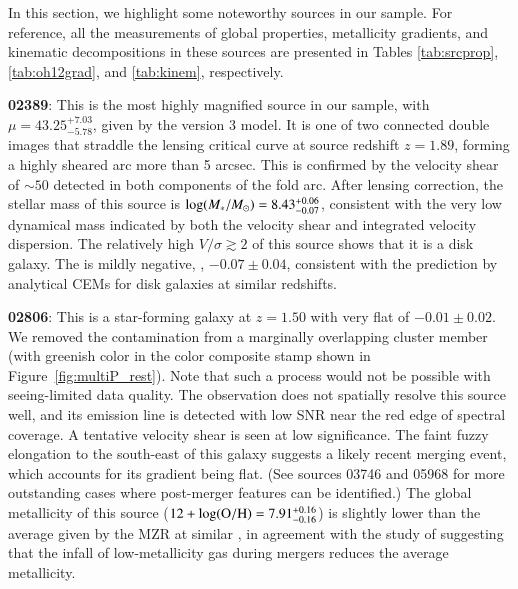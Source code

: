 In this section, we highlight some noteworthy sources in our \mg sample. For
reference, all the measurements of global properties, metallicity gradients, and kinematic
decompositions in these sources are presented in Tables \ref{tab:srcprop},
\ref{tab:oh12grad}, and \ref{tab:kinem}, respectively.

{\bf 02389}: This is the most highly magnified source in our sample, with $\mu=43.25_{-5.78}^{+7.03}$, given by the \SJ version 3
model.  It is one of two connected double images that straddle the lensing critical curve at source redshift $z=1.89$, forming a
highly sheared arc more than 5 arcsec.  This is confirmed by the velocity shear of $\sim50$ \kms detected in both components of
the fold arc.  After lensing correction, the stellar mass of this source is $\log(M_\ast/M_\odot)=8.43_{-0.07}^{+0.06}$, consistent
with the very low dynamical mass indicated by both the velocity shear and integrated velocity dispersion.  The relatively high
$V/\sigma \gtrsim 2$ of this source shows that it is a disk galaxy. The \mg is mildly negative, \ie, $-0.07\pm0.04$, consistent
with the prediction by analytical CEMs for disk galaxies at similar redshifts.

{\bf 02806}: This is a star-forming galaxy at $z=1.50$ with very flat \mg of $-0.01\pm0.02$.  We removed the contamination from a
marginally overlapping cluster member (with greenish color in the color composite stamp shown in Figure~\ref{fig:multiP_rest}).
Note that such a process would not be possible with seeing-limited data quality.  The \muse observation does not spatially resolve
this source well, and its \OII emission line is detected with low SNR near the red edge of \muse spectral coverage. A tentative
velocity shear is seen at low significance. The faint fuzzy elongation to the south-east of this galaxy suggests a likely recent
merging event, which accounts for its gradient being flat. (See sources 03746 and 05968 for more outstanding cases where
post-merger features can be identified.) The global metallicity of this source ($12+\log({\rm O/H})=7.91^{+0.16}_{-0.16}$) is slightly lower than
the average given by the MZR at similar \Mstar, in agreement with the study of \citet{MichelDansac:2008gp} suggesting that the
infall of low-metallicity gas during mergers reduces the average metallicity.

